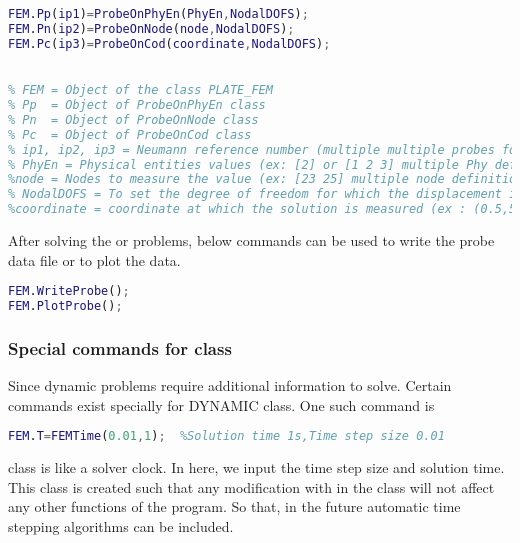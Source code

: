 \documentclass[main.tex]{subfiles}
\begin{document}
\begin{lstlisting}[language=matlab]
FEM.Pp(ip1)=ProbeOnPhyEn(PhyEn,NodalDOFS);
FEM.Pn(ip2)=ProbeOnNode(node,NodalDOFS);
FEM.Pc(ip3)=ProbeOnCod(coordinate,NodalDOFS);

  
% FEM = Object of the class PLATE_FEM 
% Pp  = Object of ProbeOnPhyEn class 
% Pn  = Object of ProbeOnNode class 
% Pc  = Object of ProbeOnCod class 
% ip1, ip2, ip3 = Neumann reference number (multiple multiple probes for same study)
% PhyEn = Physical entities values (ex: [2] or [1 2 3] multiple Phy definition will add the values of each node ) PhyEn can be a point or line or area. Probe with track the displacement of the nodes corresponding to the each PhyEn and gives the average value.
%node = Nodes to measure the value (ex: [23 25] multiple node definition will add the values of each node) 
% NodalDOFS = To set the degree of freedom for which the displacement is imposed ( ex:[1 0 0] Dirichlet specially on w displacement, multiple Nodal Dofs(ex:[1 1 0] or [1 1 1] ) will result in meaningless results )
%coordinate = coordinate at which the solution is measured (ex : (0.5,5) the coordinate must be in a nodal point or in a element edge, coordinates inside a element is not completely defined)
\end{lstlisting}
After solving the  or  problems, below commands can be used to write the probe data file or to plot the data.      
\begin{lstlisting}[language=matlab]
FEM.WriteProbe();
FEM.PlotProbe();
\end{lstlisting}



\subsubsection{Special commands for  class}

Since dynamic problems require additional information to solve. Certain commands exist specially for DYNAMIC class. One such command is 
\begin{lstlisting}[language=matlab]
FEM.T=FEMTime(0.01,1);	%Solution time 1s,Time step size 0.01 
\end{lstlisting}
 class is like a solver clock. In here, we input the time step size and solution time. This class is created such that any modification with in the class will not affect any other functions of the program. So that, in the future automatic time stepping algorithms can be included.
\end{document}
